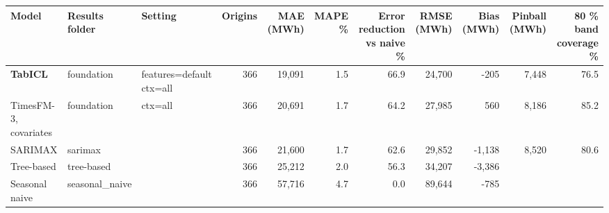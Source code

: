 \begin{tabular}{lllrrrrrrrr}
\toprule
Model & Results folder & Setting & Origins & MAE (MWh) & MAPE \% & Error reduction vs naive \% & RMSE (MWh) & Bias (MWh) & Pinball (MWh) & 80 \% band coverage \% \\
\midrule
\textbf{TabICL} & foundation & features=default ctx=all & 366 & 19,091 & 1.5 & 66.9 & 24,700 & -205 & 7,448 & 76.5 \\
TimesFM-3, covariates & foundation & ctx=all & 366 & 20,691 & 1.7 & 64.2 & 27,985 & 560 & 8,186 & 85.2 \\
SARIMAX & sarimax &  & 366 & 21,600 & 1.7 & 62.6 & 29,852 & -1,138 & 8,520 & 80.6 \\
Tree-based & tree-based &  & 366 & 25,212 & 2.0 & 56.3 & 34,207 & -3,386 &  &  \\
Seasonal naive & seasonal\_naive &  & 366 & 57,716 & 4.7 & 0.0 & 89,644 & -785 &  &  \\
\bottomrule
\end{tabular}
